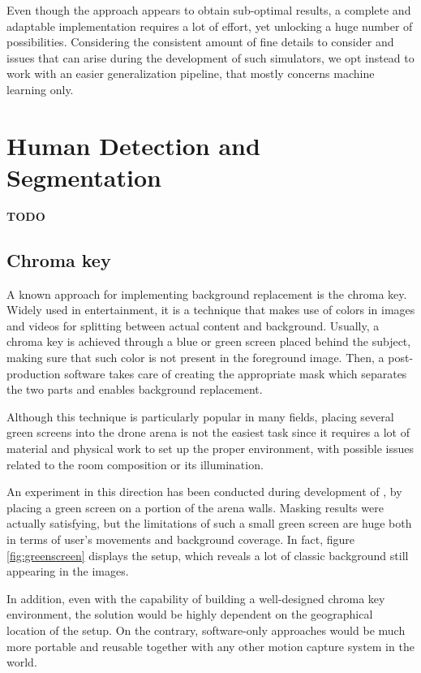 Even though the approach appears to obtain sub-optimal results, a complete and adaptable implementation requires a lot of effort, yet unlocking a huge number of possibilities. Considering the consistent amount of fine details to consider and issues that can arise during the development of such simulators, we opt instead to work with an easier generalization pipeline, that mostly concerns machine learning only.




\section{Human Detection and Segmentation}
\label{sec:sota-humandetseg}

\textbf{TODO}



\subsection{Chroma key}

A known approach for implementing background replacement is the chroma key. Widely used in entertainment, it is a technique that makes use of colors in images and videos for splitting between actual content and background. Usually, a chroma key is achieved through a blue or green screen placed behind the subject, making sure that such color is not present in the foreground image. Then, a post-production software takes care of creating the appropriate mask which separates the two parts and enables background replacement.

Although this technique is particularly popular in many fields, placing several green screens into the drone arena is not the easiest task since it requires a lot of material and physical work to set up the proper environment, with possible issues related to the room composition or its illumination.

An experiment in this direction has been conducted during development of \cite{mantegazza2019visionbased}, by placing a green screen on a portion of the arena walls. Masking results were actually satisfying, but the limitations of such a small green screen are huge both in terms of user's movements and background coverage. In fact, figure \ref{fig:greenscreen} displays the setup, which reveals a lot of classic background still appearing in the images.

In addition, even with the capability of building a well-designed chroma key environment, the solution would be highly dependent on the geographical location of the setup. On the contrary, software-only approaches would be much more portable and reusable together with any other motion capture system in the world.

